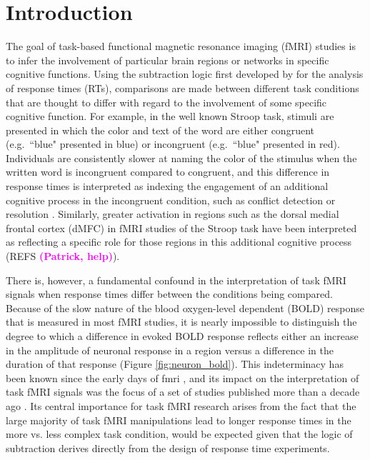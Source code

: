 \documentclass[titlepage,12pt] {article}
\newcommand{\ph}{\textcolor{magenta}{\textbf{(Patrick, help)}}}
\begin{document}
\section*{Introduction}

The goal of task-based functional magnetic resonance imaging (fMRI) studies is to infer the involvement of particular brain regions or networks in specific cognitive functions.  Using the subtraction logic first developed by \citet{donders1969} for the analysis of response times (RTs), comparisons are made between different task conditions that are thought to differ with regard to the involvement of some specific cognitive function.  For example, in the well known Stroop task, stimuli are presented in which the color and text of the word are either congruent (e.g.\ ``blue" presented in blue) or incongruent (e.g.\ ``blue" presented in red).  Individuals are consistently slower at naming the color of the stimulus when the written word is incongruent compared to congruent, and this difference in response times is interpreted as indexing the engagement of an additional cognitive process in the incongruent condition, such as conflict detection or resolution \citep{botvinick2001}. Similarly, greater activation in regions such as the dorsal medial frontal cortex (dMFC) in fMRI studies of the Stroop task have been interpreted as reflecting a specific role for those regions in this additional cognitive process (REFS \ph).  

There is, however, a fundamental confound in the interpretation of task fMRI signals when response times differ between the conditions being compared. Because of the slow nature of the blood oxygen-level dependent (BOLD) response that is measured in most fMRI studies, it is nearly impossible to distinguish the degree to which a difference in evoked BOLD response reflects either an increase in the amplitude of neuronal response in a region versus a difference in the duration of that response (Figure \ref{fig:neuron_bold}).  This indeterminacy has been known since the early days of fmri \citep{savoy1995, fslbook2001}, and its impact on the interpretation of task fMRI signals was the focus of a set of studies published more than a decade ago  \citep{grinband_detection_2008,  carp_conditional_2010, grinband_dorsal_2011, weissman_congruency_2013}.  Its central importance for task fMRI research arises from the fact that the large majority of task fMRI manipulations lead to longer response times in the more vs. less complex task condition, would be expected given that the logic of subtraction derives directly from the design of response time experiments.
\end{document}
